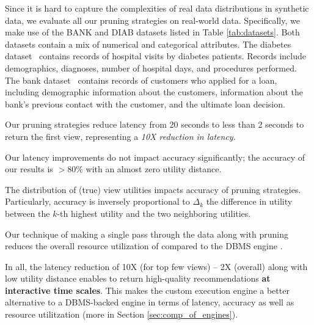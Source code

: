 Since it is hard to capture the complexities of real data distributions in synthetic data, we
evaluate all our pruning strategies on real-world data. 
Specifically, we make use of the BANK and DIAB datasets listed in Table
\ref{tab:datasets}. 
Both datasets
contain a mix of numerical and categorical attributes. 
The diabetes dataset~\cite{diab} contains records of hospital visits by diabetes patients. Records include demographics,
diagnoses, number of hospital days, and procedures performed. 
The bank dataset~\cite{bank} contains records of customers who applied for a loan, including demographic information about 
the customers, information about the bank's previous contact with the customer, and the ultimate loan decision.







\begin{denselist}
\item Our pruning strategies
reduce \SeeDB latency from 20 seconds to less than 2 seconds
to return the first view, representing a {\em 10X reduction in latency}.

\item Our latency improvements do not impact accuracy significantly;
the accuracy of our results is $> 80\%$ with an almost zero utility distance.

\item The distribution of (true) view utilities impacts accuracy of pruning strategies.
Particularly, accuracy is inversely proportional to $\Delta_k$ the difference in
utility between the $k$-th highest utility and the two neighboring utilities. 

\item Our technique of making a single pass through the data along with pruning reduces the overall
resource utilization of \SeeDB compared to the DBMS engine .


\item In all, the latency reduction of 10X (for top few views) -- 2X (overall) along with low
utility distance enables \SeeDB to return high-quality recommendations {\bf at interactive time scales}.
This makes the custom execution engine a better alternative to a DBMS-backed engine
in terms of latency, accuracy as well as resource utilitzation (more in Section \ref{sec:comp_of_engines}).
\end{denselist}

